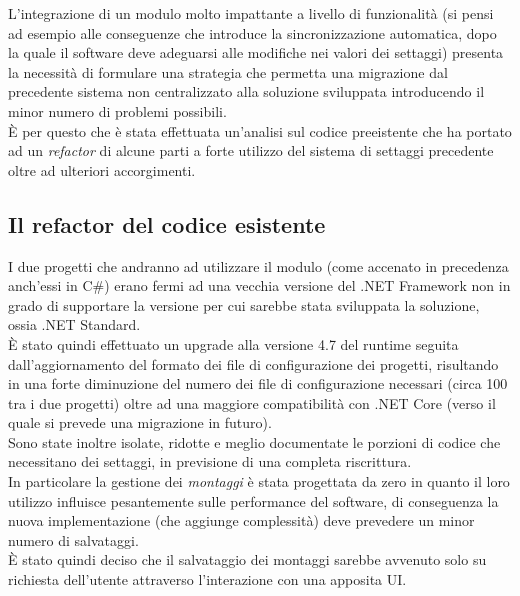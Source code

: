 \documentclass[\main/tesi.tex]{subfiles}
\begin{document}
L'integrazione di un modulo molto impattante a livello di funzionalità (si pensi ad esempio alle conseguenze che introduce la sincronizzazione automatica, dopo la quale il software deve adeguarsi alle modifiche nei valori dei settaggi) presenta la necessità di formulare una strategia che permetta una migrazione dal precedente sistema non centralizzato alla soluzione sviluppata introducendo il minor numero di problemi possibili.\\
È per questo che è stata effettuata un'analisi sul codice preeistente che ha portato ad un \textit{refactor} di alcune parti a forte utilizzo del sistema di settaggi precedente oltre ad ulteriori accorgimenti.

\subsection{Il refactor del codice esistente}
\label{refactor}
I due progetti che andranno ad utilizzare il modulo (come accenato in precedenza anch'essi in C\#) erano fermi ad una vecchia versione del .NET Framework non in grado di supportare la versione per cui sarebbe stata sviluppata la soluzione, ossia .NET Standard.\\
È stato quindi effettuato un upgrade alla versione 4.7 del runtime seguita dall'aggiornamento del formato dei file di configurazione dei progetti, risultando in una forte diminuzione del numero dei file di configurazione necessari (circa 100 tra i due progetti) oltre ad una maggiore compatibilità con .NET Core (verso il quale si prevede una migrazione in futuro).\\
Sono state inoltre isolate, ridotte e meglio documentate le porzioni di codice che necessitano dei settaggi, in previsione di una completa riscrittura.\\
In particolare la gestione dei \textit{montaggi} è stata progettata da zero in quanto il loro utilizzo influisce pesantemente sulle performance del software, di conseguenza la nuova implementazione (che aggiunge complessità) deve prevedere un minor numero di salvataggi.\\
È stato quindi deciso che il salvataggio dei montaggi sarebbe avvenuto solo su richiesta dell'utente attraverso l'interazione con una apposita UI.
\end{document}
